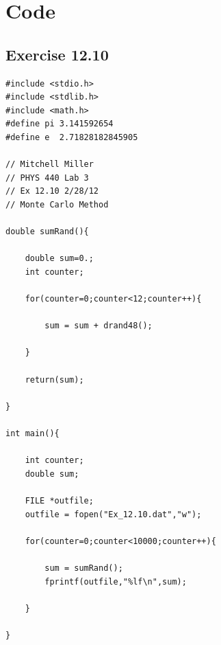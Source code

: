 \documentclass[12pt]{article}
\begin{document}
\pagebreak
\section{Code}
\subsection{Exercise 12.10}
\begin{verbatim}
#include <stdio.h>
#include <stdlib.h>
#include <math.h>
#define pi 3.141592654
#define e  2.71828182845905

// Mitchell Miller
// PHYS 440 Lab 3
// Ex 12.10 2/28/12
// Monte Carlo Method

double sumRand(){

	double sum=0.;
	int counter;

	for(counter=0;counter<12;counter++){

		sum = sum + drand48();

	}

	return(sum);

}

int main(){

	int counter;
	double sum;

	FILE *outfile;
	outfile = fopen("Ex_12.10.dat","w");

	for(counter=0;counter<10000;counter++){

		sum = sumRand();
		fprintf(outfile,"%lf\n",sum);

	}

}
\end{verbatim}
\end{document}
